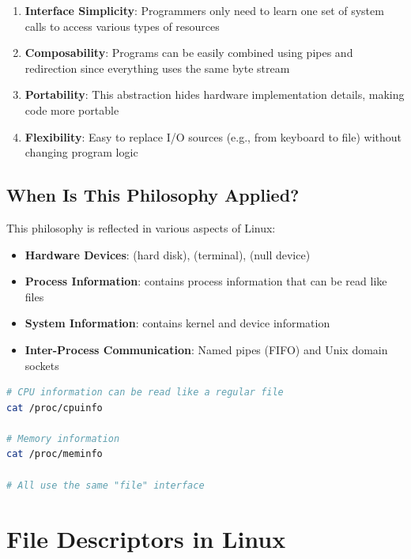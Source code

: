 \begin{enumerate}
	\item \textbf{Interface Simplicity}: Programmers only need to learn one set of system calls to access various types of resources
	\item \textbf{Composability}: Programs can be easily combined using pipes and redirection since everything uses the same byte stream
	\item \textbf{Portability}: This abstraction hides hardware implementation details, making code more portable
	\item \textbf{Flexibility}: Easy to replace I/O sources (e.g., from keyboard to file) without changing program logic
\end{enumerate}

\subsection{When Is This Philosophy Applied?}

This philosophy is reflected in various aspects of Linux:

\begin{itemize}
	\item \textbf{Hardware Devices}:  (hard disk),  (terminal),  (null device)
	\item \textbf{Process Information}:  contains process information that can be read like files
	\item \textbf{System Information}:  contains kernel and device information
	\item \textbf{Inter-Process Communication}: Named pipes (FIFO) and Unix domain sockets
\end{itemize}

\begin{examplebox}
	\begin{lstlisting}[language=bash]
# CPU information can be read like a regular file
cat /proc/cpuinfo

# Memory information
cat /proc/meminfo

# All use the same "file" interface
\end{lstlisting}
\end{examplebox}

\section{File Descriptors in Linux}
\label{sec:file-descriptors}

